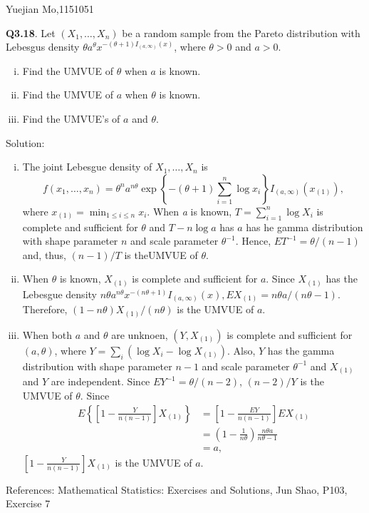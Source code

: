 \documentclass{article}
\newcommand{\tmtextbf}[1]{{\bfseries{#1}}}
\newcommand{\tmtextit}[1]{{\itshape{#1}}}
\newenvironment{enumerateroman}{\begin{enumerate}[i.] }{\end{enumerate}}
\begin{document}
Yuejian Mo,1151051

\tmtextbf{Q3.18}. Let $(X_1, \ldots, X_n)$ be a random sample from the Pareto
distribution with Lebesgus density $\theta a^{\theta} x^{- (\theta + 1) I_{(a,
\infty)} (x)}$, where $\theta > 0$ and $a > 0$.
\begin{enumerateroman}
  \item Find the UMVUE of $\theta$ when $a$ is known.
  
  \item Find the UMVUE of $a$ when $\theta$ is known.
  
  \item Find the UMVUE's of $a$ and $\theta$.
\end{enumerateroman}
Solution:
\begin{enumerateroman}
  \item The joint Lebesgue density of $X_1, \ldots, X_n$ is
  \[ f (x_1, \ldots, x_n) = \theta^n a^{n \theta} \exp \left\{ - (\theta + 1)
     \sum_{i = 1}^n \log x_i \right\} I_{(a, \infty)} (x_{(1)}), \]
  where $x_{(1)} = \min_{1 \leqslant i \leqslant n} x_i$. When \tmtextit{a} is
  known, $T = \sum_{i = 1}^n \log X_i$ is complete and sufficient for $\theta$
  and $T - n \log a$ has $a$ has he gamma distribution with shape parameter
  $n$ and scale parameter $\theta^{- 1}$. Hence, $E T^{- 1} = \theta / (n -
  1)$ and, thus, $(n - 1) / T$ is theUMVUE of $\theta$.
  
  \item When $\theta$ is known, $X_{(1)}$ is complete and sufficient for $a.$
  Since $X_{(1)}$ has the Lebesgue density $n \theta a^{n \theta} x^{- (n
  \theta + 1)} I_{(a, \infty)} (x), E X_{(1)} = n \theta a / (n \theta - 1) .$
  Therefore, $(1 - n \theta) X_{(1)} / (n \theta)$ is the UMVUE of $a$.
  
  \item When both $a$ and $\theta$ are unknoen, $(Y, X_{(1)})$ is complete and
  sufficient for $(a, \theta)$, where $Y = \sum_i (\log X_i - \log X_{(1)})$.
  Also, $Y$ has the gamma distribution with shape parameter $n - 1$ and scale
  parameter $\theta^{- 1}$ and $X_{(1)}$ and $Y$ are independent. Since $E
  Y^{- 1} = \theta / (n - 2)$, $(n - 2) / Y$ is the UMVUE of $\theta$. Since
  \[ \  \]
  \[ \begin{array}{ll}
       E \left\{ \left[ 1 - \frac{Y}{n (n - 1)} \right] X_{(1)} \right\} & =
       \left[ 1 - \frac{E Y}{n (n - 1)} \right] E X_{(1)}\\
       & = \left( 1 - \frac{1}{n \theta} \right) \frac{n \theta a}{n \theta -
       1}\\
       & = a,
     \end{array} \]
  $\left[ 1 - \frac{Y}{n (n - 1)} \right] X_{(1)}$ is the UMVUE of $a$.
\end{enumerateroman}
References: Mathematical Statistics: Exercises and Solutions, Jun Shao, P103,
Exercise 7
\end{document}
